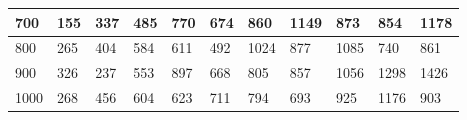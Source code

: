 \documentclass[10pt,letterpaper]{article}
\begin{document}
\begin{center}
\begin{table}
\begin{tabular} { |m{0.5cm}|m{1.3cm}|m{1.3cm}|m{1.3cm}|m{1.3cm}|m{1.3cm}|m{1.3cm}|m{1.3cm}|m{1.3cm}|m{1.3cm}|m{1.3cm}|}
\hline
\cellcolor{Gray}700 & \Large 155 & \Large 337 & \Large 485 & \Large 770 & \Large 674 & \Large 860 & \Large 1149 & \Large 873 & \Large 854 & \Large 1178 \\
\hline
\cellcolor{Gray}800 & \Large 265 & \Large 404 & \Large 584 & \Large 611 & \Large 492 & \Large 1024 & \Large 877 & \Large 1085 & \Large 740 & \Large 861 \\
\hline
\cellcolor{Gray}900 & \Large 326 & \Large 237 & \Large 553 & \Large 897 & \Large 668 & \Large 805 & \Large 857 & \Large 1056 & \Large 1298 & \Large 1426 \\
\hline
\cellcolor{Gray}1000 & \Large 268 & \Large 456 & \Large 604 & \Large 623 & \Large 711 & \Large 794 & \Large 693 & \Large 925 & \Large 1176 & \Large 903 \\
\hline
\end{tabular} \\
\end{table}
\end{center}
\newpage 
{}
\end{document}
